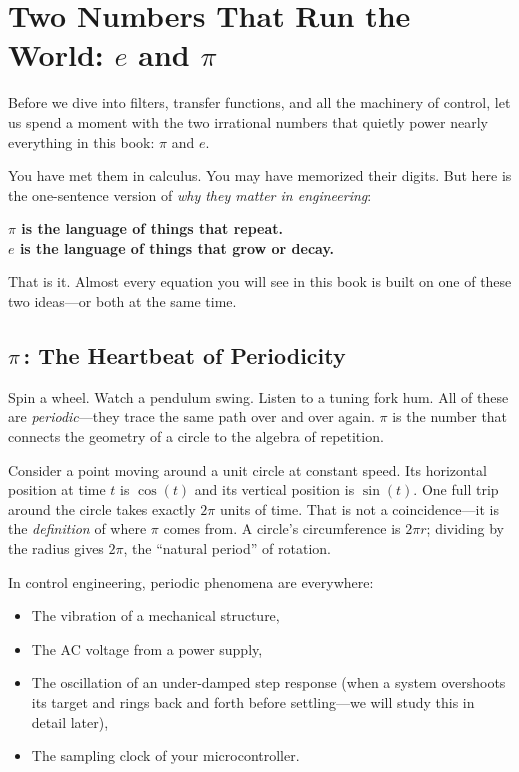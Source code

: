 \section*{Two Numbers That Run the World: $e$ and $\pi$}

Before we dive into filters, transfer functions, and all the machinery of control, let us spend a moment with the two irrational numbers that quietly power nearly everything in this book: $\pi$ and $e$.

You have met them in calculus. You may have memorized their digits. But here is the one-sentence version of \textit{why they matter in engineering}:

\begin{mdframed}
\textbf{$\pi$ is the language of things that repeat.}\\
\textbf{$e$ is the language of things that grow or decay.}
\end{mdframed}

That is it. Almost every equation you will see in this book is built on one of these two ideas---or both at the same time.

\subsection*{$\pi$\,: The Heartbeat of Periodicity}

Spin a wheel. Watch a pendulum swing. Listen to a tuning fork hum. All of these are \textit{periodic}---they trace the same path over and over again. $\pi$ is the number that connects the geometry of a circle to the algebra of repetition.

Consider a point moving around a unit circle at constant speed. Its horizontal position at time $t$ is $\cos(t)$ and its vertical position is $\sin(t)$. One full trip around the circle takes exactly $2\pi$ units of time. That is not a coincidence---it is the \textit{definition} of where $\pi$ comes from. A circle's circumference is $2\pi r$; dividing by the radius gives $2\pi$, the ``natural period'' of rotation.

In control engineering, periodic phenomena are everywhere:
\begin{itemize}[nosep]
  \item The vibration of a mechanical structure,
  \item The AC voltage from a power supply,
  \item The oscillation of an under-damped step response (when a system overshoots its target and rings back and forth before settling---we will study this in detail later),
  \item The sampling clock of your microcontroller.
\end{itemize}

